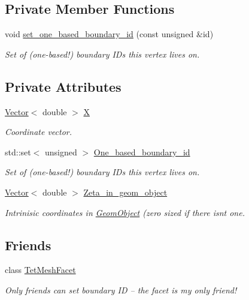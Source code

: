 \subsection*{Private Member Functions}
\begin{DoxyCompactItemize}
\item 
void \hyperlink{classoomph_1_1TetMeshVertex_ae228ef9cdc61d5902ac8bffdf163c618}{set\+\_\+one\+\_\+based\+\_\+boundary\+\_\+id} (const unsigned \&id)
\begin{DoxyCompactList}\small\item\em Set of (one-\/based!) boundary I\+Ds this vertex lives on. \end{DoxyCompactList}\end{DoxyCompactItemize}
\subsection*{Private Attributes}
\begin{DoxyCompactItemize}
\item 
\hyperlink{classoomph_1_1Vector}{Vector}$<$ double $>$ \hyperlink{classoomph_1_1TetMeshVertex_a32a797224c3506b9594b657e1032e7d9}{X}
\begin{DoxyCompactList}\small\item\em Coordinate vector. \end{DoxyCompactList}\item 
std\+::set$<$ unsigned $>$ \hyperlink{classoomph_1_1TetMeshVertex_a7bbd3bde4360f101314b6059abeecd8b}{One\+\_\+based\+\_\+boundary\+\_\+id}
\begin{DoxyCompactList}\small\item\em Set of (one-\/based!) boundary I\+Ds this vertex lives on. \end{DoxyCompactList}\item 
\hyperlink{classoomph_1_1Vector}{Vector}$<$ double $>$ \hyperlink{classoomph_1_1TetMeshVertex_a945dd663092098554d394e2b50ef9ef2}{Zeta\+\_\+in\+\_\+geom\+\_\+object}
\begin{DoxyCompactList}\small\item\em Intrinisic coordinates in \hyperlink{classoomph_1_1GeomObject}{Geom\+Object} (zero sized if there isn\textquotesingle{}t one. \end{DoxyCompactList}\end{DoxyCompactItemize}
\subsection*{Friends}
\begin{DoxyCompactItemize}
\item 
class \hyperlink{classoomph_1_1TetMeshVertex_ae3c796a1351f1249d195202d011532ce}{Tet\+Mesh\+Facet}
\begin{DoxyCompactList}\small\item\em Only friends can set boundary ID -- the facet is my only friend! \end{DoxyCompactList}\end{DoxyCompactItemize}


